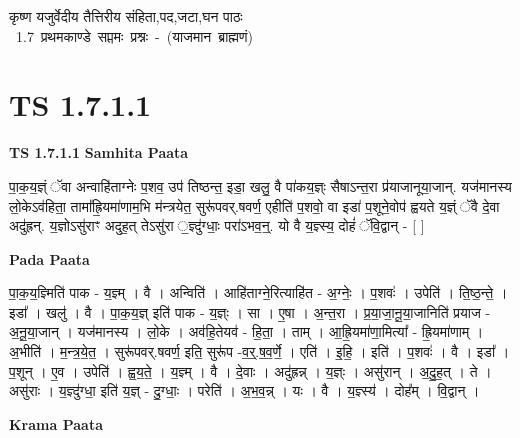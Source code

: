 \documentclass[17pt]{extarticle}
\begin{document}
\begin{titlepage}
    \begin{center}
 
\begin{sanskrit}
    { \Large
    कृष्ण यजुर्वेदीय तैत्तिरीय संहिता,पद,जटा,घन पाठः 
    }
    \\
    \vspace{2.5cm}
    \mbox{ \Large
    1.7     प्रथमकाण्डे सप्तमः प्रश्नः - (याजमान ब्राह्मणं)   }
\end{sanskrit}
\end{center}

\end{titlepage}
\tableofcontents
{}
\pagebreak


\section{ TS 1.7.1.1 }

\textbf{TS 1.7.1.1 } \newline
\textbf{Samhita Paata} \newline

पा॒क॒य॒ज्ञ्ं ॅवा अन्वाहि॑ताग्नेः प॒शव॒ उप॑ तिष्ठन्त॒ इडा॒ खलु॒ वै पा॑कय॒ज्ञ्ः सैषाऽन्त॒रा प्र॑याजानूया॒जान्. यज॑मानस्य लो॒केऽव॑हिता॒ तामा᳚ह्रि॒यमा॑णाम॒भि म॑न्त्रयेत॒ सुरू॑पवर्.षवर्ण॒ एहीति॑ प॒शवो॒ वा इडा॑ प॒शूने॒वोप॑ ह्वयते य॒ज्ञ्ं ॅवै दे॒वा अदु॑ह्रन्. य॒ज्ञोऽसु॑राꣳ अदुह॒त् तेऽसु॑रा ॒ज्ञ्दु॑ग्धाः॒ परा॑ऽभव॒न्॒. यो वै य॒ज्ञ्स्य॒ दोहं॑ ॅवि॒द्वान् - [ ] \newline

\textbf{Pada Paata} \newline

पा॒क॒य॒ज्ञ्मिति॑ पाक - य॒ज्ञ्म् । वै । अन्विति॑ । आहि॑ताग्ने॒रित्याहि॑त - अ॒ग्नेः॒ । प॒शवः॑ । उपेति॑ । ति॒ष्ठ॒न्ते॒ । इडा᳚ । खलु॑ । वै । पा॒क॒य॒ज्ञ् इति॑ पाक - य॒ज्ञ्ः । सा । ए॒षा । अ॒न्त॒रा । प्र॒या॒जा॒नू॒या॒जानिति॑ प्रयाज - अ॒नू॒या॒जान् । यज॑मानस्य । लो॒के । अव॑हि॒तेयव॑ - हि॒ता॒ । ताम् । आ॒ह्रि॒यमा॑णा॒मित्या᳚ - ह्रि॒यमा॑णाम् । अ॒भीति॑ । म॒न्त्र॒ये॒त॒ । सुरू॑पवर्.षवर्ण॒ इति॒ सुरू॑प -व॒र्॒.ष॒व॒र्णे॒ । एति॑ । इ॒हि॒ । इति॑ । प॒शवः॑ । वै । इडा᳚ । प॒शून् । ए॒व । उपेति॑ । ह्व॒य॒ते॒ । य॒ज्ञ्म् । वै । दे॒वाः । अदु॑ह्रन्न् । य॒ज्ञ्ः । असु॑रान् । अ॒दु॒ह॒त् । ते । असु॑राः । य॒ज्ञ्दु॑ग्धा॒ इति॑ य॒ज्ञ् - दु॒ग्धाः॒ । परेति॑ । अ॒भ॒व॒न्न् । यः । वै । य॒ज्ञ्स्य॑ । दोह᳚म् । वि॒द्वान् ।  \newline


\textbf{Krama Paata} \newline
\end{document}
